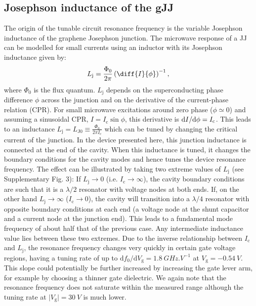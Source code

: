\documentclass[preprint,
  onecolumn,
  notitlepage,
  amsmath,amssymb,
  aip,
  apl,
]{revtex4-1}
\begin{document}
\subsection{Josephson inductance of the gJJ}

The origin of the tunable circuit resonance frequency is the variable Josephson inductance of the graphene Josephson junction.
The microwave response of a JJ can be modelled for small currents using an inductor with its Josephson inductance given by:
\begin{equation}
  L_\textrm{j} = \frac{\Phi_0}{2\pi} \left(\diff{I}{\phi}\right)^{-1}, \label{eq:Lj}
\end{equation}
where $\Phi_0$ is the flux quantum.
$L_\textrm{j}$ depends on the superconducting phase difference $\phi$ across the junction and on the derivative of the current-phase relation (CPR).
For small microwave excitations around zero phase ($\phi\simeq 0$) and assuming a sinusoidal CPR, $I=I_\textrm{c}\sin\phi$, this derivative is ${\rm d}I/{\rm d}\phi = I_\textrm{c}$.
This leads to an inductance $L_\textrm{j} = L_{\textrm{J}0} \equiv \frac{\Phi_0}{2\pi I_\textrm{c}}$ which can be tuned by changing the critical current of the junction.
In the device presented here, this junction inductance is connected at the end of the cavity.
When this inductance is tuned, it changes the boundary conditions for the cavity modes and hence tunes the device resonance frequency.
The effect can be illustrated by taking two extreme values of $L_\textrm{j}$ (see Supplementary Fig. 3):
If $L_\textrm{j}\rightarrow 0$ (i.e. $I_\textrm{c}\rightarrow\infty$), the cavity boundary conditions are such that it is a $\lambda/2$ resonator with voltage nodes at both ends.
If, on the other hand $L_\textrm{j}\rightarrow \infty$ ($I_\textrm{c}\rightarrow 0$), the cavity will transition into a $\lambda/4$ resonator with opposite boundary conditions at each end (a voltage node at the shunt capacitor and a current node at the junction end).
This leads to a fundamental mode frequency of about half that of the previous case.
Any intermediate inductance value lies between these two extremes.
Due to the inverse relationship between $I_\textrm{c}$ and $L_\textrm{j}$, the resonance frequency changes very quickly in certain gate voltage regions, having a tuning rate of up to $\mathrm{d}f_0/\mathrm{d}V_\textrm{g}=\SI{1.8}{GHz.V^{-1}}$ at $V_\textrm{g}=\SI{-0.54}{V}$.
This slope could potentially be further increased by increasing the gate lever arm, for example by choosing a thinner gate dielectric.
We again note that the resonance frequency does not saturate within the measured range although the tuning rate at $\vert V_\textrm{g} \rvert=\SI{30}{V}$ is much lower.
\end{document}
